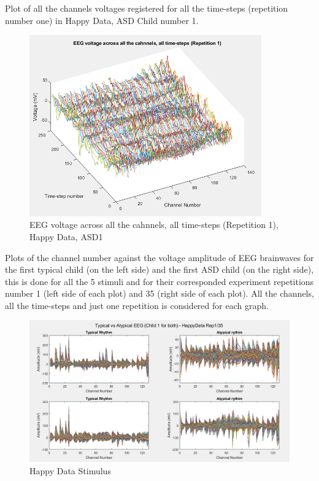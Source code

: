 \begin{appendices}
Plot of all the channels voltages registered for all the time-steps (repetition number one) in Happy Data, ASD Child number 1.

\begin{figure}[ht!]%
    \centering
    \includegraphics[width=10cm]{images/series2}%
    \caption{EEG voltage across all the cahnnels, all time-steps (Repetition 1), Happy Data, ASD1}%
\end{figure}

\clearpage

Plots of the channel number against the voltage amplitude of EEG brainwaves for the first typical child (on the left side) and the first ASD child (on the right side), this is done for all the 5 stimuli and for their corresponded experiment repetitions number 1 (left side of each plot) and 35 (right side of each plot). All the channels, all the time-steps and just one repetition is considered for each graph.

\begin{figure}[ht!]%
    \centering
    \includegraphics[width=14cm]{images/matplot1}%
    \caption{Happy Data Stimulus}%
\end{figure}


\end{appendices}
